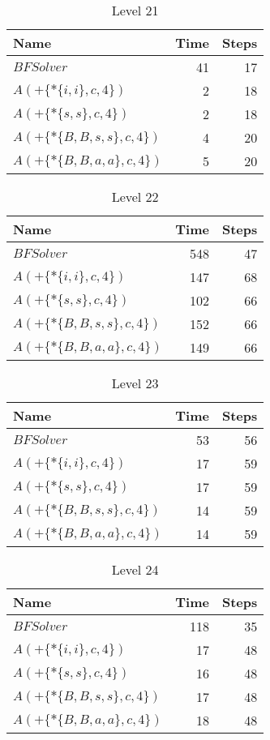 \begin{table} \centering \begin{tabular}{lrr}\toprule \textbf{ Name }
    & \textbf{ Time } & \textbf{ Steps }\\\midrule
    $BFSolver$ & 41 & 17 \\
    $A(+\{*\{i,i\},c,4\})$ & 2 & 18 \\
    $A(+\{*\{s,s\},c,4\})$ & 2 & 18 \\
    $A(+\{*\{B,B,s,s\},c,4\})$ & 4 & 20 \\
    $A(+\{*\{B,B,a,a\},c,4\})$ & 5 & 20 \\
    \bottomrule \end{tabular} \caption{Level 21}
  \label{tab:level_21} \end{table}

\begin{table} \centering \begin{tabular}{lrr}\toprule \textbf{ Name }
    & \textbf{ Time } & \textbf{ Steps }\\\midrule
    $BFSolver$ & 548 & 47 \\
    $A(+\{*\{i,i\},c,4\})$ & 147 & 68 \\
    $A(+\{*\{s,s\},c,4\})$ & 102 & 66 \\
    $A(+\{*\{B,B,s,s\},c,4\})$ & 152 & 66 \\
    $A(+\{*\{B,B,a,a\},c,4\})$ & 149 & 66 \\
    \bottomrule \end{tabular} \caption{Level 22}
  \label{tab:level_22} \end{table}

\begin{table} \centering \begin{tabular}{lrr}\toprule \textbf{ Name }
    & \textbf{ Time } & \textbf{ Steps }\\\midrule
    $BFSolver$ & 53 & 56 \\
    $A(+\{*\{i,i\},c,4\})$ & 17 & 59 \\
    $A(+\{*\{s,s\},c,4\})$ & 17 & 59 \\
    $A(+\{*\{B,B,s,s\},c,4\})$ & 14 & 59 \\
    $A(+\{*\{B,B,a,a\},c,4\})$ & 14 & 59 \\
    \bottomrule \end{tabular} \caption{Level 23}
  \label{tab:level_23} \end{table}

\begin{table} \centering \begin{tabular}{lrr}\toprule \textbf{ Name }
    & \textbf{ Time } & \textbf{ Steps }\\\midrule
    $BFSolver$ & 118 & 35 \\
    $A(+\{*\{i,i\},c,4\})$ & 17 & 48 \\
    $A(+\{*\{s,s\},c,4\})$ & 16 & 48 \\
    $A(+\{*\{B,B,s,s\},c,4\})$ & 17 & 48 \\
    $A(+\{*\{B,B,a,a\},c,4\})$ & 18 & 48 \\
    \bottomrule \end{tabular} \caption{Level 24}
  \label{tab:level_24} \end{table}

